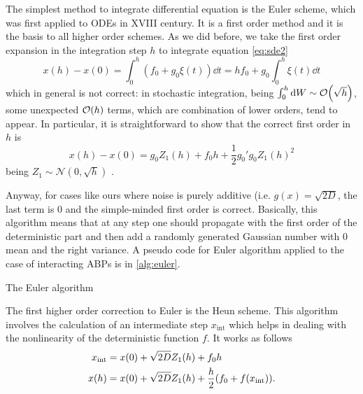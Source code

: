 \documentclass[../../master_thesis_np.tex]{subfiles}
\begin{document}
		The simplest method to integrate differential equation is the Euler scheme, which was first applied to ODEs in XVIII century. It is a first order method and it is the basis to all higher order schemes. As we did before, we take the first order expansion in the integration step $h$ to integrate equation \ref{eq:sde2}
		\begin{equation}
		x(h) - x(0) = \int_0^h (f_0 + g_0 \xi(t)) \dd{t} = h f_0 + g_0 \int_0^h \xi(t) \dd{t}
		\end{equation}
		which in general is not correct: in stochastic integration, being $\int_{0}^{h} \dd{W} \sim \order{\sqrt{h}}$, some unexpected $\order{h}$ terms, which are combination of lower orders, tend to appear. In particular, it is straightforward to show that the correct first order in $h$ is 
		\begin{equation}
		x(h) - x(0) = g_0 Z_1(h) + f_0 h + \frac{1}{2} g_0' g_0 Z_1(h)^2
		\end{equation}
		being $Z_1\sim \mathcal{N}(0,\sqrt{h})$ \cite{mannella_integration_2011}. 
		
		Anyway, for cases like ours where noise is purely additive (i.e. $g(x) = \sqrt{2D}$, the last term is $0$ and the simple-minded first order is correct. Basically, this algorithm means that at any step one should propagate with the first order of the deterministic part and then add a randomly generated Gaussian number with 0 mean and the right variance. A pseudo code for Euler algorithm applied to the case of interacting ABPs is in \ref{alg:euler}.
		
		\begin{algorithm}
			\caption{The Euler algorithm} \label{alg:euler}	
			\begin{algorithmic}[1]
				\EndFor
				\EndFor
			\end{algorithmic}
		\end{algorithm}
		
		The first higher order correction to Euler is the Heun scheme. This algorithm involves the calculation of an intermediate step $x_{\text{int}}$ which helps in dealing with the nonlinearity of the deterministic function $f$. It works as follows
		\begin{equation}
			\begin{aligned}
				x_{\text{int}} &= x(0) + \sqrt{2D} Z_1(h) + f_0 h\\
				x(h) &= x(0) + \sqrt{2D} Z_1(h) + \frac{h}{2} \qty(f_0 + f(x_{\text{int}})).
			\end{aligned}
		\end{equation}
		
\end{document}
